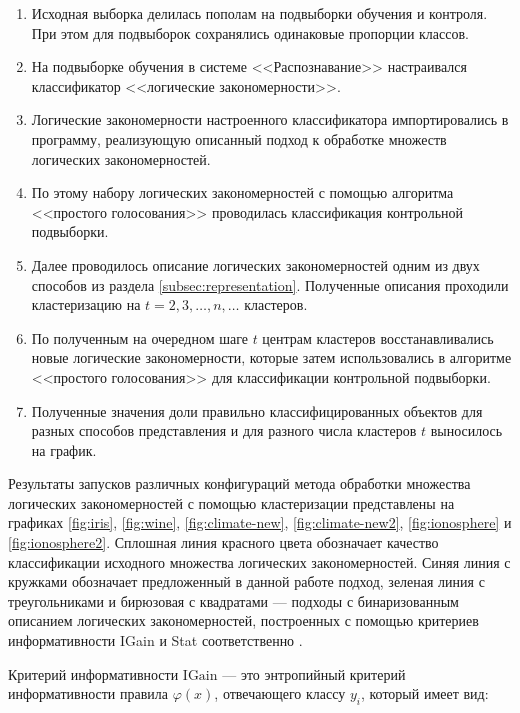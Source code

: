 \documentclass[12pt]{article}
\begin{document}
\begin{enumerate}
  \item Исходная выборка делилась пополам на подвыборки обучения и
    контроля. При этом для подвыборок сохранялись одинаковые пропорции
    классов.
  \item На подвыборке обучения в системе <<Распознавание>>
    настраивался классификатор <<логические закономерности>>.
  \item Логические закономерности настроенного классификатора
    импортировались в программу, реализующую описанный подход к
    обработке множеств логических закономерностей.
  \item По этому набору логических закономерностей с помощью
    алгоритма <<простого голосования>> \cite{voron10logicalgs}
    проводилась классификация контрольной подвыборки.
  \item Далее проводилось описание логических закономерностей одним из
    двух способов из раздела \ref{subsec:representation}. Полученные
    описания проходили кластеризацию на \(t = 2, 3, \dots, n, \dots\)
    кластеров.
  \item По полученным на очередном шаге \(t\) центрам кластеров
    восстанавливались новые логические закономерности, которые затем
    использовались в алгоритме <<простого голосования>> для
    классификации контрольной подвыборки.
  \item Полученные значения доли правильно классифицированных объектов
    для разных способов представления и для разного числа кластеров
    \(t\) выносилось на график.
\end{enumerate}

Результаты запусков различных конфигураций метода обработки множества
логических закономерностей с помощью кластеризации представлены на
графиках \ref{fig:iris}, \ref{fig:wine}, \ref{fig:climate-new},
\ref{fig:climate-new2}, \ref{fig:ionosphere} и \ref{fig:ionosphere2}.
Сплошная линия красного цвета обозначает качество классификации
исходного множества логических закономерностей. Синяя линия с кружками
обозначает предложенный в данной работе подход, зеленая линия с
треугольниками и бирюзовая с квадратами --- подходы с бинаризованным
описанием логических закономерностей, построенных с помощью критериев
информативности IGain и Stat соответственно \cite{voron10logicalgs}.

Критерий информативности \(\text{IGain}\) --- это энтропийный критерий
информативности правила \(\varphi(x)\), отвечающего классу \(y_i\),
который имеет вид:
\end{document}
